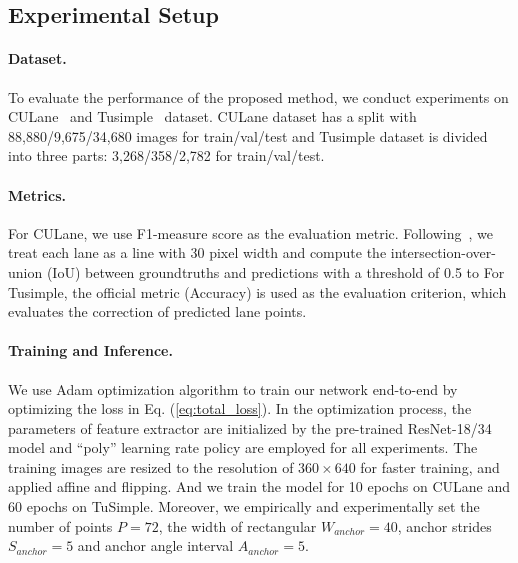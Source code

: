 \documentclass{article}
\begin{document}
\subsection{Experimental Setup}

\paragraph{Dataset.}
To evaluate the performance of the proposed method, we conduct experiments on CULane~\cite{pan2018spatial} and Tusimple~\cite{tusimple} dataset. CULane dataset has a split with 88,880/9,675/34,680 images for train/val/test and Tusimple dataset is divided into three parts: 3,268/358/2,782 for train/val/test.

\paragraph{Metrics.}
For CULane, we use F1-measure score as the evaluation metric. Following~\cite{pan2018spatial}, we treat each lane as a line with 30 pixel width and compute the intersection-over-union (IoU) between groundtruths and predictions with a threshold of 0.5 to 
For Tusimple, the official metric (Accuracy) is used as the evaluation criterion, which evaluates the correction of predicted lane points.

\paragraph{Training and Inference.}
We use Adam optimization algorithm to train our network end-to-end by optimizing the loss in Eq. (\ref{eq:total_loss}). In the optimization process, the parameters of feature extractor are initialized by the pre-trained ResNet-18/34 model and ``poly'' learning rate policy are employed for all experiments. The training images are resized to the resolution of $360 \times 640$ for faster training, and applied affine and flipping. And we train the model for 10 epochs on CULane and 60 epochs on TuSimple.  Moreover, we empirically and experimentally set the number of points $P=72$, the width of rectangular $W_{anchor} = 40$, anchor strides $S_{anchor} = 5$ and anchor angle interval $A_{anchor} = 5$.
\end{document}
